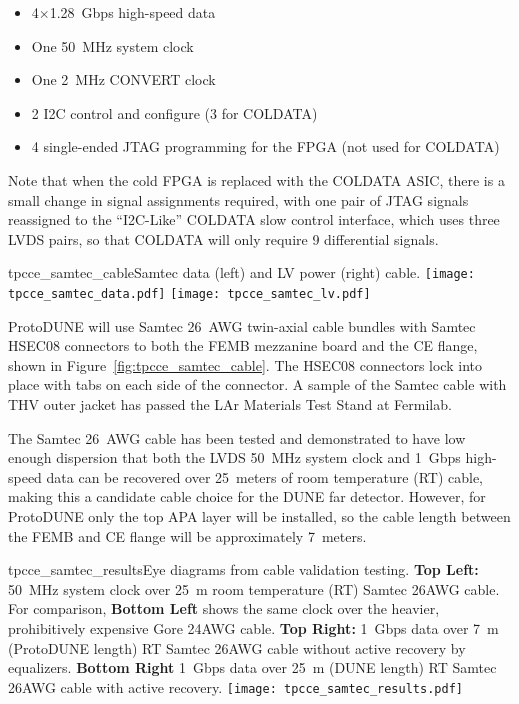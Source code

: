 \begin{itemize}
    \item 4$\times$1.28~Gbps high-speed data
    \item One 50~MHz system clock
    \item One 2~MHz CONVERT clock
    \item 2 I2C control and configure (3 for COLDATA)
    \item 4 single-ended JTAG programming for the FPGA (not used for COLDATA)
\end{itemize}

Note that when the cold FPGA is replaced with the COLDATA ASIC, there
is a small change in signal assignments required, with one pair of
JTAG signals reassigned to the ``I2C-Like'' COLDATA slow control
interface, which uses three LVDS pairs, so that COLDATA will only
require 9 differential signals.

\begin{cdrfigure}{tpcce_samtec_cable}{Samtec data (left) and LV power (right) cable.}
\texttt{[image: tpcce\_samtec\_data.pdf]}
\texttt{[image: tpcce\_samtec\_lv.pdf]}
\end{cdrfigure}

ProtoDUNE will use Samtec 26~AWG twin-axial cable bundles with Samtec HSEC08 connectors to both
the FEMB mezzanine board and the CE flange, shown in Figure~\ref{fig:tpcce_samtec_cable}. The HSEC08
connectors lock into place with tabs on each side of the connector. A sample of the Samtec cable with
THV outer jacket has passed the LAr Materials Test Stand at Fermilab.

The Samtec 26~AWG cable has been
tested and demonstrated to have low enough dispersion that both the LVDS 50~MHz system clock and
1~Gbps high-speed data can be recovered over 25~meters of room temperature (RT) cable, making this
a candidate cable choice for the DUNE far detector. However, for ProtoDUNE only the top APA
layer will be installed, so the cable length between the FEMB and CE flange will be approximately 7~meters.

\begin{cdrfigure}{tpcce_samtec_results}{Eye diagrams 
from cable validation testing. {\bf Top Left:} 50~MHz system clock over 25~m room temperature 
(RT) Samtec 26AWG cable. For comparison, {\bf Bottom Left} shows the same clock over 
the heavier, prohibitively expensive Gore 24AWG cable. {\bf Top Right:} 1~Gbps data over 
7~m (ProtoDUNE length) RT Samtec 26AWG cable without active recovery by equalizers. {\bf Bottom Right} 1~Gbps
data over 25~m (DUNE length) RT Samtec 26AWG cable with active recovery.}
\texttt{[image: tpcce\_samtec\_results.pdf]}
\end{cdrfigure}

